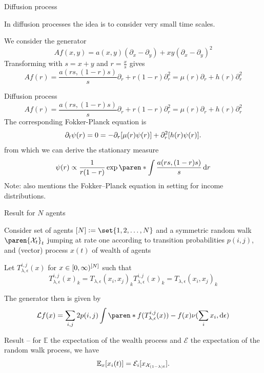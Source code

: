 \documentclass[9pt]{beamer}
\begin{document}
\begin{frame}{Diffusion process}

In diffusion processes the idea is to consider very small time scales.

We consider the generator
\[
Af(x, y) = a(x, y)(\partial_x - \partial_y) + xy (\partial_x - \partial_y)^2
\]
Transforming with $s = x+y$ and $r = \frac{x}{s}$ gives
\pause
\[
Af(r)
= \frac{a(rs, (1-r)s)}{s}\partial_r + r(1-r) \partial_r^2
= \mu(r)\partial_r + h(r) \partial_r^2
\]
\end{frame}



\begin{frame}{Diffusion process}
\[
Af(r)
= \frac{a(rs, (1-r)s)}{s}\partial_r + r(1-r) \partial_r^2
= \mu(r)\partial_r + h(r) \partial_r^2
\]
The corresponding Fokker-Planck equation is
\pause
\[
\partial_t \psi(r) = 0 =
- \partial_r[\mu(r) \psi(r)] + \partial_r^2[h(r) \psi(r)].
\]
from which we can derive the stationary measure
\pause
\[
\psi(r) \propto \frac{1}{r(1-r)}\exp\paren*{\int\frac{a(rs, (1-r)s)}{s} \diff r} %
\]
Note:  also mentions the Fokker--Planck equation in setting for income distributions.
\end{frame}




\begin{frame}{Result for $N$ agents}

Consider set of agents $\brackets{N} \defeq \set{1, 2, \hdots, N}$ and a symmetric random walk $\paren{\mathcal{X}_t}_t$ jumping at rate one according to transition probabilities $p(i,j)$, and (vector) process $x(t)$ of wealth of agents

\pause

Let $T_{\lambda, \epsilon}^{i, j}(x)$ for $x \in [0, \infty)^{[N]}$ such that
\[
T_{\lambda, \epsilon}^{i, j}(x)_k = T_{\lambda, \epsilon}(x_i, x_j)_k
T_{\lambda, \epsilon}^{i, j}(x)_k = T_{\lambda, \epsilon}(x_i, x_j)_k
\]

\pause

The generator then is given by
\[
\mathcal{L}f(x) = \sum_{i, j} 2 p(i, j) \int \paren*{f(T_{\lambda, \epsilon}^{i, j}(x)) - f(x)} \nu(\sum_i x_i, \diff \epsilon)
\]

\pause

Result -- for $\mathbb{E}$ the expectation of the wealth process and $\mathcal{E}$ the expectation of the random walk process, we have
\[
\mathbb{E}_x[x_i(t)] = \mathcal{E}_i[x_{\mathcal{X}_{(1-\lambda)t}}].
\]
\end{frame}
\end{document}
